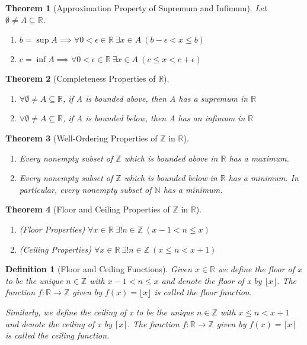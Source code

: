 \documentclass[11pt, oneside]{book}
\theoremstyle{break}
\newtheorem{thm}{Theorem}[section]
\newtheorem{defn}{Definition}[section]
\newcommand{\bb}[1]{\mathbb{#1}}			%
\newcommand{\floor}[1]{\lfloor #1 \rfloor}	%
\newcommand{\ceiling}[1]{\lceil #1 \rceil}	%
\begin{document}
\begin{thm}[Approximation Property of Supremum and Infimum]\label{approx_prop}
	Let $\emptyset \neq A \subseteq \bb{R}$.
	\begin{enumerate}
		\item $b = \sup A \implies \forall 0 < \epsilon \in \bb{R} \> \exists x \in A \> (b - \epsilon < x \leq b)$
		\item $c = \inf A \implies \forall 0 < \epsilon \in \bb{R} \> \exists x \in A \> (c \leq x < c + \epsilon)$
	\end{enumerate}
\end{thm}

\begin{thm}[Completeness Properties of $\bb{R}$]
	\begin{enumerate}
		\item $\forall \emptyset \neq A \subseteq \bb{R}$, if A is bounded above, then A has a supremum in $\bb{R}$
		\item $\forall \emptyset \neq A \subseteq \bb{R}$, if A is bounded below, then A has an infimum in $\bb{R}$
	\end{enumerate}
\end{thm}

\begin{thm}[Well-Ordering Properties of $\bb{Z}$ in $\bb{R}$]
	\begin{enumerate}
		\item Every nonempty subset of $\bb{Z}$ which is bounded above in $\bb{R}$ has a maximum.
		\item Every nonempty subset of $\bb{Z}$ which is bounded below in $\bb{R}$ has a minimum. In particular, every nonempty subset of $\bb{N}$ has a minimum.
	\end{enumerate}
\end{thm}

\begin{thm}[Floor and Ceiling Properties of $\bb{Z}$ in $\bb{R}$]
	\begin{enumerate}
		\item (Floor Properties) $\forall x \in \bb{R} \> \exists! n \in \bb{Z} \> (x - 1 < n \leq x)$
		\item (Ceiling Properties) $\forall x \in \bb{R} \> \exists! n \in \bb{Z} \> (x \leq n < x + 1)$
	\end{enumerate}	
\end{thm}

\begin{defn}[Floor and Ceiling Functions]
	Given $x \in \bb{R}$ we define the floor of x to be the unique $n \in \bb{Z}$ with $x - 1 < n \leq x$ and denote the floor of x by $\floor{x}$. The function $f: \bb{R} \to \bb{Z}$ given by $f(x) = \floor{x}$ is called the floor function.

	Similarly, we define the ceiling of x to be the unique $n \in \bb{Z}$ with $x \leq n < x + 1$ and denote the ceiling of x by $\ceiling{x}$. The function $f: \bb{R} \to \bb{Z}$ given by $f(x) = \ceiling{x}$ is called the ceiling function.
\end{defn}
\end{document}
